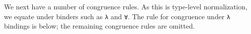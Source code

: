 \documentclass[authoryear, acmsmall, screen, review, nonacm]{acmart} %
\begin{document}
\Ni We next have a number of congruence rules. As this is type-level normalization, we equate under binders such as \verb!λ! and \verb!∀!. The rule for congruence under \verb!λ! bindings is below; the remaining congruence rules are omitted.
\begin{code}%
%
\>[4]\AgdaSpace{}%
\AgdaSymbol{:}\AgdaSpace{}%
\AgdaSpace{}%
\AgdaSymbol{\{}\AgdaSpace{}%
\AgdaSpace{}%
\AgdaSymbol{:}\AgdaSpace{}%
\AgdaSpace{}%
\AgdaSymbol{(}\AgdaSpace{}%
\AgdaOperator{\AgdaInductiveConstructor{,,}}\AgdaSpace{}%
\AgdaSymbol{)}\AgdaSpace{}%
\AgdaSymbol{\}}\AgdaSpace{}%
\AgdaSpace{}%
\AgdaSpace{}%
\AgdaSpace{}%
\AgdaSpace{}%
\AgdaSpace{}%
\AgdaSpace{}%
\AgdaSpace{}%
\AgdaSpace{}%
\AgdaSpace{}%
\<%
\end{code}
\end{document}
